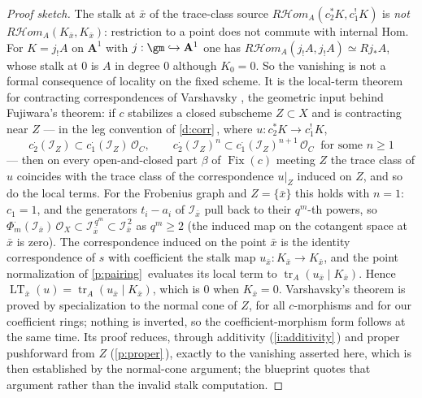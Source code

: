 \documentclass[11pt]{article}
\theoremstyle{plain}
\theoremstyle{definition}
\newcommand{\Cref}[1]{\hyperref[#1]{\ref{#1}}\,\hyperref[#1]{\nameref*{#1}}}
\newcommand{\RHom}{R\mathcal Hom_A}
\newcommand{\Fix}{\operatorname{Fix}}
\newcommand{\tr}{\operatorname{tr}}
\newcommand{\LT}{\operatorname{LT}}
\begin{document}
\begin{proof}[Proof sketch]
The stalk at $\bar x$ of the trace-class source $\RHom(c_2^*K,c_1^!K)$ is
\emph{not} $\RHom(K_{\bar x},K_{\bar x})$:  restriction to a point does not
commute with internal Hom.  For $K=j_!A$ on $\mathbf A^1$ with
$j:\gm\hookrightarrow\mathbf A^1$ one has $\RHom(j_!A,j_!A)\simeq Rj_*A$,
whose stalk at $0$ is $A$ in degree $0$ although $K_0=0$.  So the vanishing
is not a formal consequence of locality on the fixed scheme.  It is the
local-term theorem for contracting correspondences of Varshavsky
\cite[Def.~2.1.1, Thm.~2.1.3]{varsh}, the geometric input behind
Fujiwara's theorem:  if $c$ stabilizes a closed subscheme $Z\subset X$ and
is contracting near $Z$ --- in the leg convention of \Cref{d:corr}, where
$u:c_2^*K\to c_1^!K$,
\[
 c_2^{\cdot}(\mathcal I_Z)\subset c_1^{\cdot}(\mathcal I_Z)\,\mathcal O_C,
 \qquad
 c_2^{\cdot}(\mathcal I_Z)^n\subset c_1^{\cdot}(\mathcal I_Z)^{n+1}\,\mathcal O_C
 \ \text{ for some }n\ge1
\]
--- then on every open-and-closed part $\beta$ of $\Fix(c)$ meeting $Z$ the
trace class of $u$ coincides with the trace class of the correspondence
$u|_Z$ induced on $Z$, and so do the local terms.  For the Frobenius graph
and $Z=\{\bar x\}$ this holds with $n=1$:  $c_1=1$, and the generators
$t_i-a_i$ of $\mathcal I_{\bar x}$ pull back to their $q^m$-th powers, so
$\Phi_m^{\cdot}(\mathcal I_{\bar x})\,\mathcal O_X\subset\mathcal I_{\bar x}^{\,q^m}\subset\mathcal I_{\bar x}^{\,2}$
as $q^m\ge2$ (the induced map on the cotangent space at $\bar x$ is zero).
The correspondence induced on the point $\bar x$ is the identity
correspondence of $s$ with coefficient the stalk map
$u_{\bar x}:K_{\bar x}\to K_{\bar x}$, and the point normalization of
\Cref{p:pairing} evaluates its local term to $\tr_A(u_{\bar x}\mid K_{\bar x})$.
Hence $\LT_{\bar x}(u)=\tr_A(u_{\bar x}\mid K_{\bar x})$, which is $0$ when
$K_{\bar x}=0$.  Varshavsky's theorem is proved by specialization to the
normal cone of $Z$, for all $c$-morphisms and for our coefficient rings;
nothing is inverted, so the coefficient-morphism form follows at the same
time.  Its proof reduces, through additivity (\Cref{i:additivity}) and
proper pushforward from $Z$ (\Cref{p:proper}), exactly to the vanishing
asserted here, which is then established by the normal-cone argument;  the
blueprint quotes that argument rather than the invalid stalk computation.
\end{proof}
\end{document}
